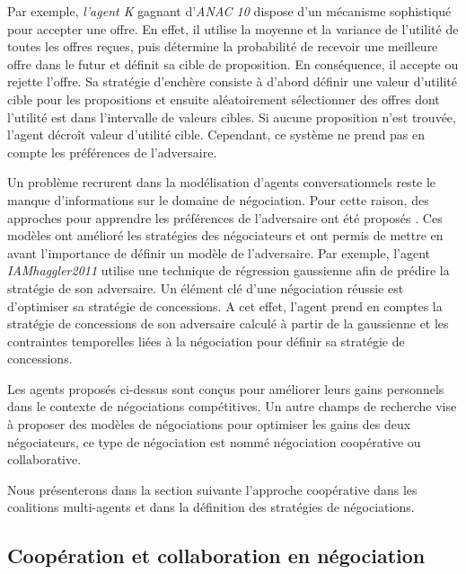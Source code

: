 	Par exemple, \textit{l'agent K} \cite{kawaguchi2011compromising} gagnant d'\emph{ANAC 10} dispose d'un mécanisme sophistiqué pour accepter une offre. En effet, il utilise la moyenne et la variance de l'utilité de toutes les offres reçues, puis détermine la probabilité de recevoir une meilleure offre dans le futur et définit sa cible de proposition. En conséquence, il accepte ou rejette l'offre. Sa stratégie d'enchère consiste à d'abord définir une valeur d'utilité cible pour les propositions et ensuite aléatoirement sélectionner des offres dont l'utilité est dans l'intervalle de valeurs cibles. Si aucune proposition n'est trouvée, l'agent décroît valeur d'utilité cible.	Cependant, ce système ne prend pas en compte les préférences de l'adversaire. 
	
	Un problème recrurent dans la modélisation d'agents conversationnels reste le manque d'informations sur le domaine de négociation. Pour cette raison, des approches pour apprendre les préférences de l'adversaire ont été proposés  \cite{williams2011using,jonker2012negotiating,frieder2013value,hindriks2008creating,hindriks2008opponent}. Ces modèles ont amélioré les stratégies des négociateurs et ont permis de mettre en avant l'importance de définir un modèle de l'adversaire. Par exemple, l'agent \textit{IAMhaggler2011} \cite{williams2011using} utilise une technique de régression gaussienne afin de prédire la stratégie de son adversaire. Un élément clé d'une négociation réussie est d'optimiser sa stratégie de concessions. A cet effet, l'agent prend en comptes la stratégie de concessions de son adversaire calculé à partir de la gaussienne et les contraintes temporelles liées à la négociation pour définir sa stratégie de concessions. 
	
	Les agents proposés ci-dessus sont conçus pour améliorer leurs gains personnels dans le contexte de négociations compétitives. Un autre champs de recherche vise à proposer des modèles de négociations pour optimiser les gains des deux négociateurs, ce type de négociation est nommé négociation coopérative ou collaborative. 
	
	Nous présenterons dans la section suivante l'approche coopérative dans les coalitions multi-agents et dans la définition des stratégies de négociations. 
	
		\subsection{Coopération et collaboration en négociation}
		
